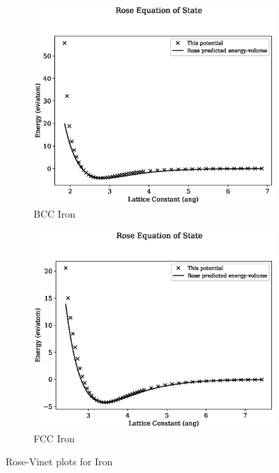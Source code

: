 \begin{figure}[htb]
\begin{subfigure}{.48\textwidth}
  \centering
  \includegraphics[width=.94\linewidth]{chapters/potentials_fe_pd_ru/fepd_potential/eos/rose_plot_bp_0.eps}  
  \caption{BCC Iron}
  \label{fig:rose-vinet-bcc-fe}
\end{subfigure}
\begin{subfigure}{.48\textwidth}
  \centering
  \includegraphics[width=.94\linewidth]{chapters/potentials_fe_pd_ru/fepd_potential/eos/rose_plot_bp_1.eps}  
  \caption{FCC Iron}
  \label{fig:rose-vinet-fcc-fe}
\end{subfigure}
\label{fig:fe-rosevinet}
\caption{Rose-Vinet plots for Iron}
\end{figure}

